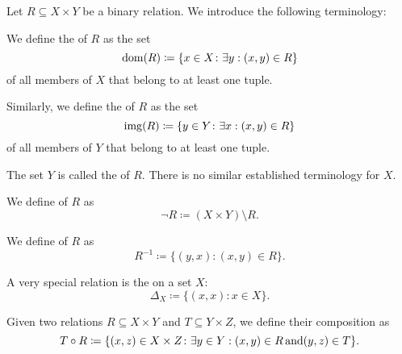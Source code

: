 \begin{definition}\label{def:binary_relation}
  Let \( R \subseteq X \times Y \) be a binary relation. We introduce the following terminology:
  \begin{defenum}[series=def:binary_relation]
     We define the  of \( R \) as the set
    \begin{equation*}
      \operatorname{dom}(R) \coloneqq \{ x \in X \colon \exists y: (x, y) \in R \}
    \end{equation*}
    of all members of \( X \) that belong to at least one tuple.

     Similarly, we define the  of \( R \) as the set
    \begin{equation*}
      \operatorname{img}(R) \coloneqq \{ y \in Y \colon \exists x: (x, y) \in R \}
    \end{equation*}
    of all members of \( Y \) that belong to at least one tuple.

     The set \( Y \) is called the  of \( R \). There is no similar established terminology for \( X \).

     We define  of \( R \) as
    \begin{equation*}
      \neg R \coloneqq (X \times Y) \setminus R.
    \end{equation*}

     We define  of \( R \) as
    \begin{equation*}
      R^{-1} \coloneqq \{ (y, x) \colon (x, y) \in R \}.
    \end{equation*}

     A very special relation is the  on a set \( X \):
    \begin{equation*}
      \Delta_X \coloneqq \{ (x, x) \colon x \in X \}.
    \end{equation*}

     Given two relations \( R \subseteq X \times Y \) and \( T \subseteq Y \times Z \), we define their composition as
    \begin{equation*}
      T \circ R \coloneqq \{ (x, z) \in X \times Z \colon \exists y \in Y: (x, y) \in R \mathop{\text{and}} (y, z) \in T \}.
    \end{equation*}
  \end{defenum}


\end{definition}
